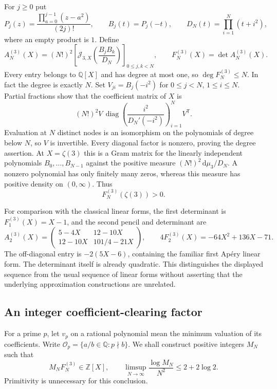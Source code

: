 \documentclass[11pt,letterpaper]{article}
\theoremstyle{definition}
\newcommand{\Q}{\mathbb Q}
\newcommand{\Z}{\mathbb Z}
\newcommand{\dd}{\,\mathrm d}
\begin{document}
For $j\ge0$ put
\[
 P_j(z)=\frac{\prod_{a=0}^{j-1}(z-a^2)}{(2j)!},\qquad
 B_j(t)=P_j(-t),\qquad D_N(t)=\prod_{i=1}^N(t+i^2),
\]
where an empty product is $1$. Define
\begin{equation}\label{eq:z3-pencil}
 A_N^{(3)}(X)
 =(N!)^2\left[
 \mathcal J_{3,X}\left(\frac{B_jB_k}{D_N}\right)
 \right]_{0\le j,k<N},\qquad
 F_N^{(3)}(X)=\det A_N^{(3)}(X).
\end{equation}
Every entry belongs to $\Q[X]$ and has degree at most one, so
$\deg F_N^{(3)}\le N$. In fact the degree is exactly $N$.
Set $V_{ji}=B_j(-i^2)$ for $0\le j<N$, $1\le i\le N$.
Partial fractions show that the coefficient matrix of $X$ is
\[
 (N!)^2 V\,\operatorname{diag}\left(
       \frac{i^2}{D_N'(-i^2)}\right)_{i=1}^N V^{\mathsf T}.
\]
Evaluation at $N$ distinct nodes is an isomorphism on the polynomials
of degree below $N$, so $V$ is invertible. Every diagonal factor is
nonzero, proving the degree assertion. At $X=\zeta(3)$ this is a Gram matrix for
the linearly independent polynomials $B_0,\ldots,B_{N-1}$ against the
positive measure $(N!)^2\dd\mu_3/D_N$. A nonzero polynomial has only
finitely many zeros, whereas this measure has positive density on
$(0,\infty)$. Thus
\begin{equation}\label{eq:z3-positive}
 F_N^{(3)}(\zeta(3))>0.
\end{equation}

For comparison with the classical linear forms, the first determinant is
$F_1^{(3)}(X)=X-1$, and the second pencil and determinant are
\begin{equation}\label{eq:z3-small-example}
 A_2^{(3)}(X)=
 \begin{pmatrix}
 5-4X&12-10X\\
 12-10X&101/4-21X
 \end{pmatrix},\qquad
 4F_2^{(3)}(X)=-64X^2+136X-71.
\end{equation}
The off-diagonal entry is $-2(5X-6)$, containing the familiar first
Ap\'ery linear form. The determinant itself is already quadratic.
This distinguishes the displayed sequence from the usual sequence of
linear forms without asserting that the underlying approximation
constructions are unrelated.

\subsection{An integer coefficient-clearing factor}

For a prime $p$, let $v_p$ on a rational polynomial mean the minimum
valuation of its coefficients. Write
$\mathcal O_p=\{a/b\in\Q:p\nmid b\}$.
We shall construct positive integers $M_N$ such that
\begin{equation}\label{eq:z3-clearing-goal}
 M_NF_N^{(3)}\in\Z[X],\qquad
 \limsup_{N\to\infty}\frac{\log M_N}{N^2}
 \le2+2\log2.
\end{equation}
Primitivity is unnecessary for this conclusion.
\end{document}
